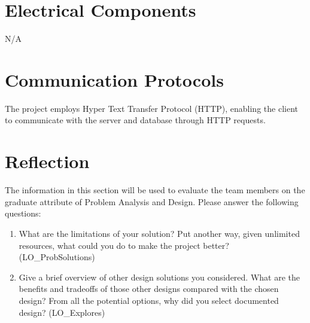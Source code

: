 \documentclass[12pt, titlepage]{article}
\begin{document}
	\section{Electrical Components}
	N/A
	
	\section{Communication Protocols}
	The project employs Hyper Text Transfer Protocol (HTTP), enabling the client to communicate with the server and database through HTTP requests.
	
	\section{Reflection}
	
	The information in this section will be used to evaluate the team members on the
	graduate attribute of Problem Analysis and Design.  Please answer the following questions:
	
	\begin{enumerate}
		\item What are the limitations of your solution?  Put another way, given
		unlimited resources, what could you do to make the project better? (LO\_ProbSolutions)
		\item Give a brief overview of other design solutions you considered.  What
		are the benefits and tradeoffs of those other designs compared with the chosen
		design?  From all the potential options, why did you select documented design?
		(LO\_Explores)
	\end{enumerate}
	
\end{document}
